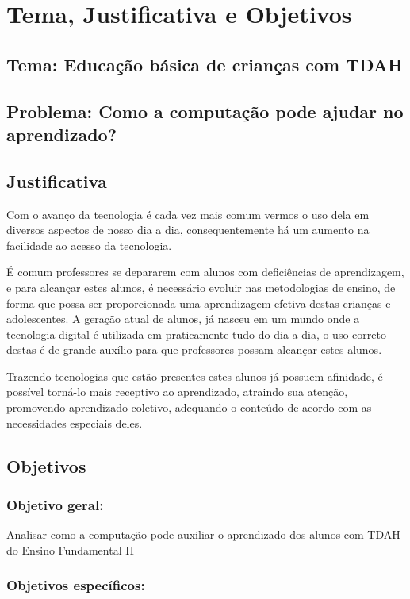 \section{Tema, Justificativa e Objetivos}

\subsection*{Tema: Educação básica de crianças com TDAH}

\subsection*{Problema: Como a computação pode ajudar no aprendizado?}

\subsection{Justificativa}

Com o avanço da tecnologia é cada vez mais comum vermos o uso dela em diversos aspectos de nosso dia a dia, consequentemente há um aumento na facilidade ao acesso da tecnologia.

É comum professores se depararem com alunos com deficiências de aprendizagem, e para alcançar estes alunos, é necessário evoluir nas metodologias de ensino, de forma que possa ser proporcionada uma aprendizagem efetiva destas crianças e adolescentes. A geração atual de alunos, já nasceu em um mundo onde a tecnologia digital é utilizada em praticamente tudo do dia a dia, o uso correto destas é de grande auxílio para que professores possam alcançar estes alunos.

Trazendo tecnologias que estão presentes estes alunos já possuem afinidade, é possível torná-lo mais receptivo ao aprendizado, atraindo sua atenção, promovendo aprendizado coletivo, adequando o conteúdo de acordo com as necessidades especiais deles.

\subsection{Objetivos}

\subsubsection{Objetivo geral:} Analisar como a computação pode auxiliar o aprendizado dos alunos com TDAH do Ensino Fundamental II

\subsubsection{Objetivos específicos:}

